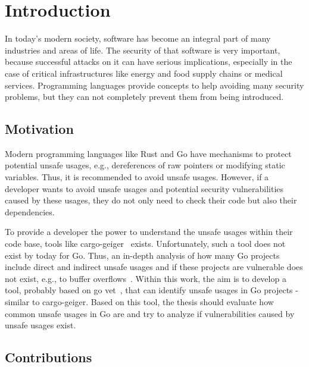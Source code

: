 
\chapter{Introduction}\label{ch:introduction}

In today's modern society, software has become an integral part of many industries and areas of life.
The security of that software is very important, because successful attacks on it can have serious implications,
especially in the case of critical infrastructures like energy and food supply chains or medical services.
Programming languages provide concepts to help avoiding many security problems, but they can not completely prevent
them from being introduced.



\section{Motivation}\label{sec:motivation}

Modern programming languages like Rust and Go have mechanisms to protect potential
unsafe usages, e.g., dereferences of raw pointers or modifying static variables. Thus, it is
recommended to avoid unsafe usages. However, if a developer wants to avoid unsafe
usages and potential security vulnerabilities caused by these usages, they do not only need
to check their code but also their dependencies.

To provide a developer the power to understand the unsafe usages within their code base,
tools like cargo-geiger~\cite{cargogeiger} exists. Unfortunately, such a tool does not exist by today for Go.
Thus, an in-depth analysis of how many Go projects include direct and indirect unsafe
usages and if these projects are vulnerable does not exist, e.g., to buffer overflows~\cite{larochelle2001, alnaeli2017, wang2020}.
Within this work, the aim is to develop a tool, probably based on go vet~\cite{govet}, that can identify
unsafe usages in Go projects - similar to cargo-geiger. Based on this tool, the thesis should
evaluate how common unsafe usages in Go are and try to analyze if vulnerabilities caused
by unsafe usages exist.



\section{Contributions}\label{sec:contributions}

